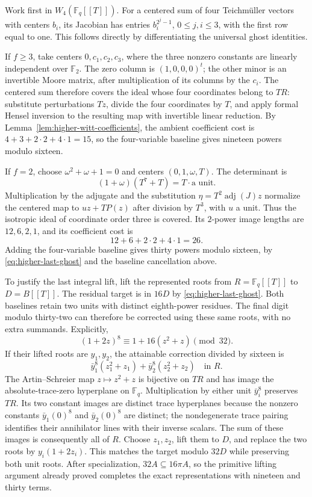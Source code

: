 \documentclass[11pt,reqno]{amsart}
\numberwithin{equation}{section}
\theoremstyle{definition}
\begin{document}
Work first in $W_4(\mathbb F_q[[T]])$. For a centered sum of four
Teichm\"uller vectors with centers $b_i$, its Jacobian has entries
$b_i^{2^j-1}$, $0\le j,i\le3$, with the first row equal to one.
This follows directly by differentiating the universal ghost identities.

If $f\ge3$, take centers $0,c_1,c_2,c_3$, where the three nonzero
constants are linearly independent over $\mathbb F_2$. The zero column
is $(1,0,0,0)^t$; the other minor is an invertible Moore matrix, after
multiplication of its columns by the $c_i$. The centered sum therefore
covers the ideal whose four coordinates belong to $TR$: substitute
perturbations $Tz$, divide the four coordinates by $T$, and apply
formal Hensel inversion to the resulting map with invertible
linear reduction.
By Lemma~\ref{lem:higher-witt-coefficients}, the ambient coefficient cost is
$4+3+2\cdot2+4\cdot1=15$, so the four-variable baseline gives
nineteen powers modulo sixteen.

If $f=2$, choose $\omega^2+\omega+1=0$ and centers $(0,1,\omega,T)$.
The determinant is
\[
 (1+\omega)(T^7+T)=T\cdot\text{a unit}.
\]
Multiplication by the adjugate and the substitution
$\eta=T^2\operatorname{adj}(J)z$ normalize the centered map to
$uz+TP(z)$ after division by $T^3$, with $u$ a unit. Thus the
isotropic ideal of coordinate order three is covered. Its $2$-power
image lengths are $12,6,2,1$, and its coefficient cost is
\[
 12+6+2\cdot2+4\cdot1=26.
\]
Adding the four-variable baseline gives thirty powers modulo sixteen,
by \eqref{eq:higher-last-ghost} and the baseline cancellation above.

To justify the last integral lift, lift the represented roots from
$R=\mathbb F_q[[T]]$ to $D=B[[T]]$. The residual target is in $16D$
by \eqref{eq:higher-last-ghost}. Both baselines retain two units
with distinct eighth-power residues. The final digit modulo
thirty-two can therefore be corrected using these same roots, with
no extra summands. Explicitly,
\[
 (1+2z)^8\equiv1+16(z^2+z)\pmod{32}.
\]
If their lifted roots are $y_1,y_2$, the attainable correction divided
by sixteen is
\[
 \bar y_1^8(z_1^2+z_1)+\bar y_2^8(z_2^2+z_2)\quad\text{in }R.
\]
The Artin--Schreier map $z\mapsto z^2+z$ is bijective on $TR$ and
has image the absolute-trace-zero hyperplane on $\mathbb F_q$.
Multiplication by either unit $\bar y_i^8$ preserves $TR$.
Its two constant images are distinct trace hyperplanes because the
nonzero constants $\bar y_1(0)^8$ and $\bar y_2(0)^8$ are distinct;
the nondegenerate trace pairing identifies their annihilator lines
with their inverse scalars. The sum of these images is consequently
all of $R$. Choose $z_1,z_2$, lift them to $D$, and replace the two
roots by $y_i(1+2z_i)$. This matches the target modulo $32D$ while
preserving both unit roots. After specialization, $32A\subseteq16\pi A$,
so the primitive lifting argument already proved completes the exact
representations with nineteen and thirty terms.
\end{document}
